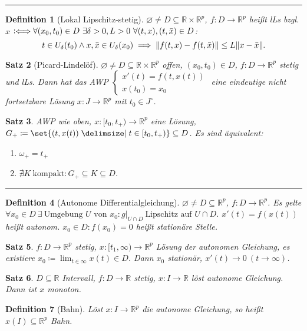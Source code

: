 \documentclass[a4paper]{article}
\newcounter{Sec}
\theoremstyle{marginbreak}
\newtheorem{definition}{Definition}[Sec]
\newtheorem{satz}[definition]{Satz}
\newcommand{\sep}{%
	\rule{\textwidth}{0.3pt}%
	\stepcounter{Sec}%
	}
\newcommand{\defiff}{\mathrel{\vcentcolon\Longleftrightarrow}}
\newcommand{\R}{\mathbb{R}}
\begin{document}
	\sep
	\begin{definition}[Lokal Lipschitz-stetig]
		$\varnothing\neq D\subseteq \R\times\R^p$, $f\colon D\to\R^p$ heißt lLs bzgl. $x$
		$\defiff\forall(x_0, t_0)\in D~\exists\delta>0, L>0~\forall (t, x), (t, \bar{x})\in D$:
		\[
			t\in U_\delta(t_0)\wedge x, \bar{x}\in U_\delta(x_0)\implies\norm{f(t, x)-f(t, \bar{x})}\leq L\norm{x-\bar{x}}.
		\]
	\end{definition}
	\begin{satz}[Picard-Lindelöf]
		$\varnothing\neq D\subseteq\R\times\R^p$ offen, $(x_0, t_0)\in D$, $f\colon D\to\R^p$
		stetig und lLs. Dann hat das AWP $\begin{cases}x'(t)=f(t, x(t))\\x(t_0)=x_0\end{cases}$
		eine eindeutige nicht fortsetzbare Lösung $x\colon J\to\R^p$ mit $t_0\in J^\circ$.
	\end{satz}
	\begin{satz}
		AWP wie oben, $x\colon [t_0,t_+)\to\R^p$ eine Lösung, $G_+\coloneqq\set{(t, x(t))\given t\in[t_0,t_+)}\subseteq D$.
		Es sind äquivalent:
		\begin{enumerate}[label=(\alph*)]
			\item $\omega_+=t_+$
			\item $\nexists K~\text{kompakt}: G_+\subseteq K\subseteq D$.
		\end{enumerate}
	\end{satz}
	\sep
	\begin{definition}[Autonome Differentialgleichung]
		$\varnothing\neq D\subseteq \R^p$, $f\colon D\to\R^p$. Es gelte $\forall x_0\in D~\exists~\text{Umgebung $U$ von $x_0$}: g|_{U\cap D}
		~\text{Lipschitz auf $U\cap D$}$.
		$x'(t)=f(x(t))$ heißt autonom. $x_0\in D: f(x_0)=0$ heißt
		stationäre Stelle.
	\end{definition}
	\begin{satz}
		$f\colon D\to\R^p$ stetig, $x\colon [t_1,\infty)\to\R^p$ Lösung der autonomen Gleichung,
		es existiere $x_0\coloneqq\lim_{t\in\infty}x(t)\in D$. Dann $x_0$ stationär, $x'(t)\to 0~(t\to\infty)$.
	\end{satz}
	\begin{satz}
		$D\subseteq\R$ Intervall, $f\colon D\to\R$ stetig, $x\colon I\to\R$ löst autonome Gleichung. Dann ist $x$
		monoton.
	\end{satz}
	\begin{definition}[Bahn]
		Löst $x\colon I\to\R^p$ die autonome Gleichung, so heißt $x(I)\subseteq\R^p$ Bahn.
	\end{definition}
\end{document}
